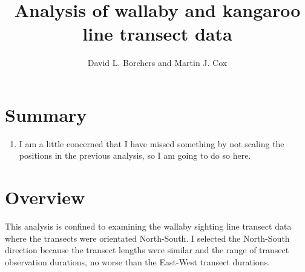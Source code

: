 \documentclass{article}
\begin{document}


\title{Analysis of wallaby and kangaroo line transect data}
\author{David L. Borchers and Martin J. Cox}
\maketitle
\section{Summary}
\begin{enumerate}
\item I am a little concerned that I have missed something by not scaling the positions in the previous analysis, so I am going to do so here.
\end{enumerate}

\section{Overview}
This analysis is confined to examining the wallaby sighting line transect data where the transects were orientated North-South.  I selected the North-South direction because the transect lengths were similar and the range of transect observation durations, no worse than the East-West transect durations. 
\end{document}
